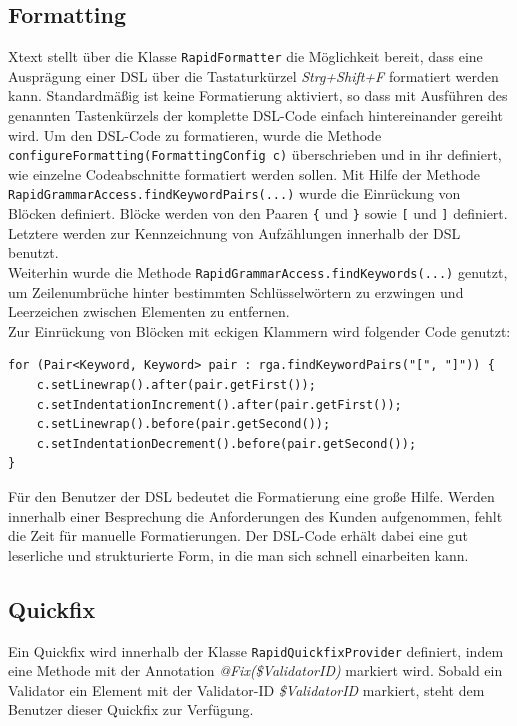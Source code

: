 \documentclass[a4paper,12pt]{scrreprt}
\begin{document}
\subsection{Formatting}
Xtext stellt über die Klasse \verb+RapidFormatter+ die Möglichkeit bereit, dass eine Ausprägung einer DSL über die Tastaturkürzel \textit{Strg+Shift+F} formatiert werden kann.
Standardmäßig ist keine Formatierung aktiviert, so dass mit Ausführen des genannten Tastenkürzels der komplette DSL-Code einfach hintereinander gereiht wird.
Um den DSL-Code zu formatieren, wurde die Methode \\
\verb+configureFormatting(FormattingConfig c)+ überschrieben und in ihr definiert, wie einzelne Codeabschnitte formatiert werden sollen. Mit Hilfe der Methode \verb+RapidGrammarAccess.findKeywordPairs(...)+ wurde die Einrückung von Blöck\-en definiert. Blöcke werden von den Paaren \verb+{+ und \verb+}+ sowie \verb+[+ und \verb+]+ definiert. Letztere werden zur Kennzeichnung von Aufzählungen innerhalb der DSL benutzt.\\
Weiterhin wurde die Methode \verb+RapidGrammarAccess.findKeywords(...)+ genutzt, um Zeilenumbrüche hinter bestimmten Schlüsselwörtern zu erzwingen und Leerzeichen zwischen Elementen zu entfernen.
\\
Zur Einrückung von Blöcken mit eckigen Klammern wird folgender Code genutzt:
\begin{verbatim}
for (Pair<Keyword, Keyword> pair : rga.findKeywordPairs("[", "]")) {
    c.setLinewrap().after(pair.getFirst());
    c.setIndentationIncrement().after(pair.getFirst());
    c.setLinewrap().before(pair.getSecond());
    c.setIndentationDecrement().before(pair.getSecond());
}
\end{verbatim}

Für den Benutzer der DSL bedeutet die Formatierung eine große Hilfe. Werden innerhalb einer Besprechung die Anforderungen des Kunden aufgenommen, fehlt die Zeit für manuelle Formatierungen. Der DSL-Code erhält dabei eine gut leserliche und strukturierte Form, in die man sich schnell einarbeiten kann.

\subsection{Quickfix}
Ein Quickfix wird innerhalb der Klasse \verb+RapidQuickfixProvider+ definiert, indem eine Methode mit der Annotation \emph{@Fix(\$ValidatorID)} markiert wird. Sobald ein Validator ein Element mit der Validator-ID \emph{\$ValidatorID} markiert, steht dem Benutzer dieser Quickfix zur Verfügung.
\end{document}

